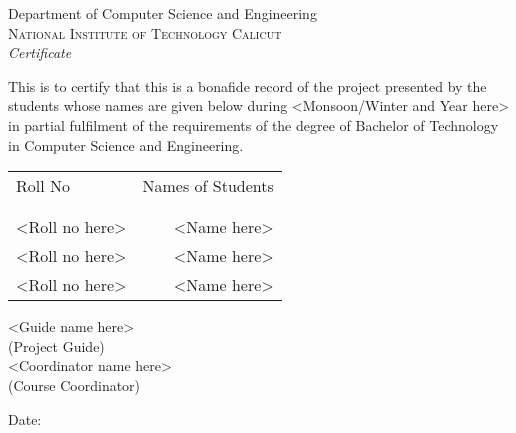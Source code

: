 \newpage
\thispagestyle{empty}

\begin{center}
	
	\huge{Department of Computer Science and Engineering}\\[0.5cm]
	\normalsize
	\textsc{National Institute of Technology Calicut}\\[2.0cm]
	
	\emph{\LARGE Certificate}\\[2.5cm]
\end{center}
\normalsize This is to certify that this is a bonafide record of the project presented by the students whose names are given below during <Monsoon/Winter and Year here> in partial fulfilment of the requirements of the degree of Bachelor of Technology in Computer Science and Engineering.\\[1.0cm]

\begin{table}[h]
	\centering
	\begin{tabular}{lr}
		Roll No & Names of Students \\ \\ \hline
		\\
		<Roll no here> & <Name here> \\ 
		<Roll no here> & <Name here> \\
		<Roll no here> & <Name here> \\
	\end{tabular}
\end{table}

\vfill


\begin{flushright}
	<Guide name here>\\
	(Project Guide)\\[1.5cm]
	<Coordinator name here>\\
	(Course Coordinator)\\
\end{flushright}

\begin{flushleft}
	Date:
\end{flushleft}